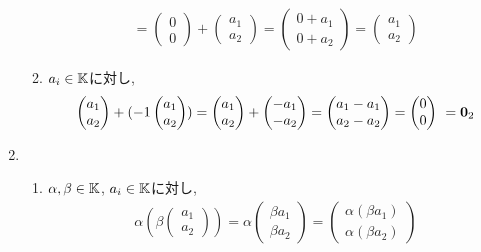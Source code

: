 \begin{example}
\begin{enumerate}
\begin{enumerate}
\begin{align*}
=    \begin{pmatrix}0\\0\end{pmatrix}+\begin{pmatrix}a_1\\a_2\end{pmatrix}
=\begin{pmatrix}0+a_1\\0+a_2\end{pmatrix}
=\begin{pmatrix}a_1\\a_2\end{pmatrix}
\end{align*}
    \item $a_i\in\mathbb{K}$に対し,
    \begin{align*}
    \begin{pmatrix}a_1\\a_2\end{pmatrix}+(-1\begin{pmatrix}a_1\\a_2\end{pmatrix})
    =\begin{pmatrix}a_1\\a_2\end{pmatrix}+\begin{pmatrix}-a_1\\-a_2\end{pmatrix}
    =\begin{pmatrix}a_1-a_1\\a_2-a_2\end{pmatrix}
=\begin{pmatrix}0\\0\end{pmatrix}\
=\boldsymbol{0}_2
\end{align*}
    \end{enumerate}
  \item
    \begin{enumerate}
    \item
      $\alpha,\beta\in\mathbb{K}$, $a_i\in\mathbb{K}$に対し,
    \begin{align*}
    \alpha(\beta\begin{pmatrix}a_1\\a_2\end{pmatrix})
    =\alpha\begin{pmatrix}\beta a_1\\\beta a_2\end{pmatrix}
    =\begin{pmatrix}\alpha(\beta a_1)\\\alpha(\beta a_2)\end{pmatrix}\\

\end{align*}
\end{enumerate}
\end{enumerate}
\end{example}

